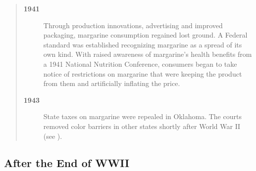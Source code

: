\documentclass[mnsc,blindrev]{informs3}
\begin{document}
\begin{quotation}
\begin{description}
\item[\bf 1941] Through production innovations, advertising and improved
packaging, margarine consumption regained lost ground. A Federal
standard  was established recognizing margarine as a spread of its
own kind. With raised awareness of margarine's health benefits from
a 1941 National Nutrition Conference, consumers began to take notice
of restrictions on margarine that were keeping the product from them
and artificially inflating the price.

\item[\bf 1943] State taxes on margarine were repealed in Oklahoma. The courts
removed color barriers in other states shortly after World War II (see \citealt{tjp}).

\end{description}

\end{quotation}


\subsection{After the End of WWII}
\end{document}
